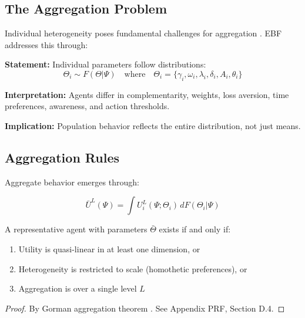 \subsection{The Aggregation Problem}

Individual heterogeneity poses fundamental challenges for aggregation
\citep{kirman1992whom}. EBF addresses this through:

\begin{tcolorbox}[colback=gray!5!white, colframe=gray!75!black,
    title=Axiom AZ-H1: Distributional Heterogeneity]
\textbf{Statement:} Individual parameters follow distributions:
\begin{equation}
\Theta_i \sim F(\Theta | \Psi) \quad \text{where} \quad \Theta_i = \{\gamma_i, \omega_i, \lambda_i, \delta_i, A_i, \theta_i\}
\end{equation}

\textbf{Interpretation:} Agents differ in complementarity, weights, loss aversion,
time preferences, awareness, and action thresholds.

\textbf{Implication:} Population behavior reflects the entire distribution, not just means.
\end{tcolorbox}

\subsection{Aggregation Rules}

Aggregate behavior emerges through:

\begin{equation}
\bar{U}^L(\Psi) = \int U^L_i(\Psi; \Theta_i) \, dF(\Theta_i | \Psi)
\end{equation}

\begin{proposition}
A representative agent with parameters $\bar{\Theta}$ exists if and only if:
\begin{enumerate}
\item Utility is quasi-linear in at least one dimension, or
\item Heterogeneity is restricted to scale (homothetic preferences), or
\item Aggregation is over a single level $L$
\end{enumerate}
\end{proposition}

\begin{proof}
By Gorman aggregation theorem \citep{gorman1953community}.
See Appendix PRF, Section D.4.
\end{proof}

